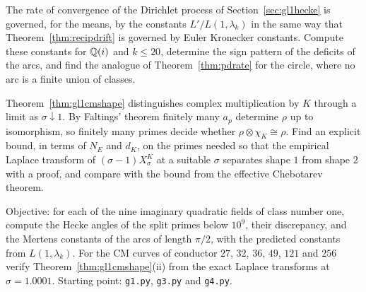 \begin{problem}\label{op:gl1rate}
The rate of convergence of the Dirichlet process of Section~\ref{sec:gl1hecke} is governed, for the means, by the constants $L'/L(1,\lambda_k)$ in the same way that Theorem~\ref{thm:recipdrift} is governed by Euler Kronecker constants. Compute these constants for $\mathbb{Q}(i)$ and $k\le20$, determine the sign pattern of the deficits of the arcs, and find the analogue of Theorem~\ref{thm:pdrate} for the circle, where no arc is a finite union of classes.
\end{problem}

\begin{problem}\label{op:gl1cm}
Theorem~\ref{thm:gl1cmshape} distinguishes complex multiplication by $K$ through a limit as $\sigma\downarrow1$. By Faltings' theorem finitely many $a_p$ determine $\rho$ up to isomorphism, so finitely many primes decide whether $\rho\otimes\chi_K\cong\rho$. Find an explicit bound, in terms of $N_E$ and $d_K$, on the primes needed so that the empirical Laplace transform of $(\sigma-1)X^K_\sigma$ at a suitable $\sigma$ separates shape $1$ from shape $2$ with a proof, and compare with the bound from the effective Chebotarev theorem.
\end{problem}

\begin{compproblem}\label{cp:gl1}
Objective: for each of the nine imaginary quadratic fields of class number one, compute the Hecke angles of the split primes below $10^9$, their discrepancy, and the Mertens constants of the arcs of length $\pi/2$, with the predicted constants from $L(1,\lambda_k)$. For the CM curves of conductor $27$, $32$, $36$, $49$, $121$ and $256$ verify Theorem~\ref{thm:gl1cmshape}(ii) from the exact Laplace transforms at $\sigma=1.0001$. Starting point: \texttt{g1.py}, \texttt{g3.py} and \texttt{g4.py}.
\end{compproblem}
